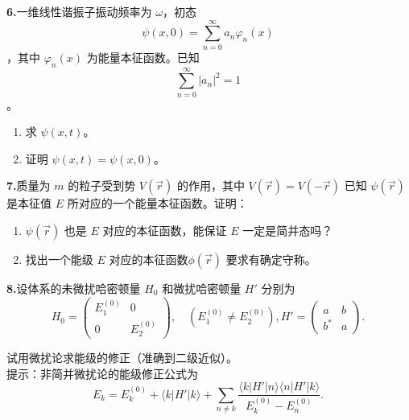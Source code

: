 \textbf{6.}一维线性谐振子振动频率为 $\omega$，初态 $$\psi(x, 0) = \sum_{n=0}^{\infty} a_n \varphi_n(x)~$$，其中 $\varphi_n(x)$ 为能量本征函数。已知 $$\sum_{n=0}^{\infty} |a_n|^2 = 1~$$。
\begin{enumerate}
    \item 求 $\psi(x, t)$。
    \item 证明 $\psi(x, t) = \psi(x, 0) $。
\end{enumerate}

\textbf{7.}质量为 $m$ 的粒子受到势 $V(\vec{r})$ 的作用，其中 $V(\vec{r}) = V(-\vec{r})$ 已知 $\psi(\vec{r})$ 是本征值 $E$ 所对应的一个能量本征函数。证明：
\begin{enumerate}
    \item  $\psi(\vec{r})$ 也是 $E$ 对应的本征函数，能保证 $E$ 一定是简并态吗？
    \item  找出一个能级 $E$ 对应的本征函数$\phi(\vec{r})$ 要求有确定守称。
\end{enumerate}

\textbf{8.}设体系的未微扰哈密顿量 $H_0$ 和微扰哈密顿量 $H'$ 分别为
$$H_0 = \begin{pmatrix}
E_1^{(0)} & 0 \\
0 & E_2^{(0)}
\end{pmatrix}, \quad (E_1^{(0)} \neq E_2^{(0)}),
H' = \begin{pmatrix}
a & b \\
b^* & a
\end{pmatrix}.~$$

试用微扰论求能级的修正（准确到二级近似）。\\
提示：非简并微扰论的能级修正公式为
$$E_k = E_k^{(0)} + \langle k | H' | k \rangle + \sum_{n \neq k} \frac{\langle k | H' | n \rangle \langle n | H' | k \rangle}{E_k^{(0)} - E_n^{(0)}}.~$$

